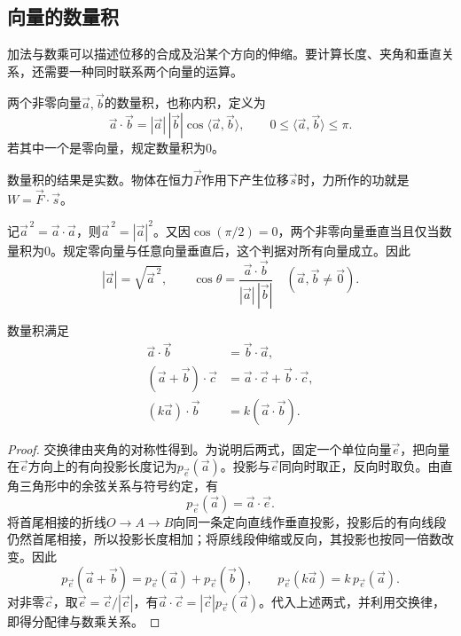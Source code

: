 \subsection{向量的数量积}

加法与数乘可以描述位移的合成及沿某个方向的伸缩。要计算长度、夹角和垂直关系，还需要一种同时联系两个向量的运算。

\begin{definition}\label{def:geometric-dot-product}
两个非零向量\(\vec a,\vec b\)的{\heiti 数量积}，也称内积，定义为
\[
 \vec a\cdot\vec b=|\vec a|\,|\vec b|\cos\langle\vec a,\vec b\rangle,
 \qquad 0\le\langle\vec a,\vec b\rangle\le\pi.
\]
若其中一个是零向量，规定数量积为0。
\end{definition}

数量积的结果是实数。物体在恒力\(\vec F\)作用下产生位移\(\vec s\)时，力所作的功就是\(W=\vec F\cdot\vec s\)。

记\(\vec a^{\,2}=\vec a\cdot\vec a\)，则\(\vec a^{\,2}=|\vec a|^2\)。又因\(\cos(\pi/2)=0\)，两个非零向量垂直当且仅当数量积为0。规定零向量与任意向量垂直后，这个判据对所有向量成立。因此
\begin{equation}\label{eq:vector-metric-dot}
 |\vec a|=\sqrt{\vec a^{\,2}},\qquad
 \cos\theta=\frac{\vec a\cdot\vec b}{|\vec a|\,|\vec b|}
 \quad(\vec a,\vec b\ne\vec0).
\end{equation}

\begin{proposition}\label{prop:geometric-dot-laws}
数量积满足
\[
\begin{aligned}
 \vec a\cdot\vec b&=\vec b\cdot\vec a,\\
 (\vec a+\vec b)\cdot\vec c&=\vec a\cdot\vec c+\vec b\cdot\vec c,\\
 (k\vec a)\cdot\vec b&=k(\vec a\cdot\vec b).
\end{aligned}
\]
\end{proposition}

\begin{proof}
交换律由夹角的对称性得到。为说明后两式，固定一个单位向量\(\vec e\)，把向量在\(\vec e\)方向上的有向投影长度记为\(p_{\vec e}(\vec a)\)。投影与\(\vec e\)同向时取正，反向时取负。由直角三角形中的余弦关系与符号约定，有
\[
 p_{\vec e}(\vec a)=\vec a\cdot\vec e.
\]
将首尾相接的折线\(O\to A\to B\)向同一条定向直线作垂直投影，投影后的有向线段仍然首尾相接，所以投影长度相加；将原线段伸缩或反向，其投影也按同一倍数改变。因此
\[
 p_{\vec e}(\vec a+\vec b)=p_{\vec e}(\vec a)+p_{\vec e}(\vec b),
 \qquad p_{\vec e}(k\vec a)=k\,p_{\vec e}(\vec a).
\]
对非零\(\vec c\)，取\(\vec e=\vec c/|\vec c|\)，有\(\vec a\cdot\vec c=|\vec c|p_{\vec e}(\vec a)\)。代入上述两式，并利用交换律，即得分配律与数乘关系。
\end{proof}

